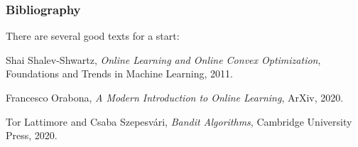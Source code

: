 \documentclass{beamer}
\begin{document}
\begin{frame}
\frametitle{Bibliography}
There are several good texts for a start:

\begin{enumerate}
{\small
\item Shai Shalev-Shwartz, \textit{Online Learning and Online
Convex Optimization}, Foundations and Trends in Machine Learning, 2011.

\item Francesco Orabona, \textit{A Modern Introduction to Online Learning},  ArXiv, 2020.

\item Tor Lattimore and Csaba Szepesv\'{a}ri, \textit{Bandit Algorithms},  Cambridge University Press, 2020.}
\end{enumerate}

\end{frame}
\end{document}

